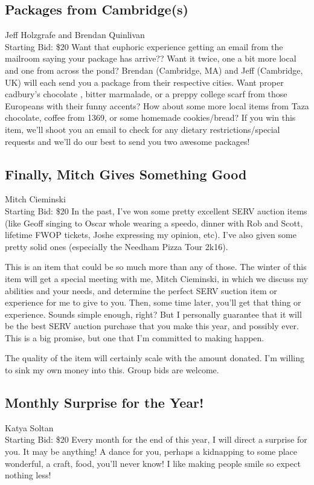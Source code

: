 \documentclass[11pt]{article}
\begin{document}
\subsection{Packages from Cambridge(s)}
Jeff Holzgrafe and Brendan Quinlivan
\\
Starting Bid: \$20
\newline
Want that euphoric experience getting an email from the mailroom saying your package has arrive?? Want it twice, one a bit more local and one from across the pond? Brendan (Cambridge, MA) and Jeff (Cambridge, UK) will each send you a package from their respective cities.  Want proper cadbury's chocolate , bitter marmalade, or a preppy college scarf  from those Europeans with their funny accents?  How about some more local items from Taza chocolate, coffee from 1369, or some homemade cookies/bread? If you win this item, we’ll shoot you an email to check for any dietary restrictions/special requests and we’ll do our best to send you two awesome packages!
\subsection{Finally, Mitch Gives Something Good}
Mitch Cieminski
\\
Starting Bid: \$20
\newline
In the past, I've won some pretty excellent SERV auction items (like Geoff singing to Oscar whole wearing a speedo, dinner with Rob and Scott, lifetime FWOP tickets, Joshe expressing my opinion, etc). I've also given some pretty solid ones (especially the Needham Pizza Tour 2k16). 

This is an item that could be so much more than any of those. The winter of this item will get a special meeting with me, Mitch Cieminski, in which we discuss my abilities and your needs, and determine the perfect SERV suction item or experience for me to give to you. Then, some time later, you'll get that thing or experience. Sounds simple enough, right? But I personally guarantee that it will be the best SERV auction purchase that you make this year, and possibly ever. This is a big promise, but one that I'm committed to making happen.

The quality of the item will certainly scale with the amount donated. I'm willing to sink my own money into this. Group bids are welcome.
\subsection{Monthly Surprise for the Year!}
Katya Soltan
\\
Starting Bid: \$20
\newline
Every month for the end of this year, I will direct a surprise for you. It may be anything! A dance for you, perhaps a kidnapping to some place wonderful, a craft, food, you'll never know! I like making people smile so expect nothing less!
\end{document}
